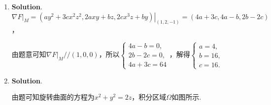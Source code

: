 \documentclass[../main.tex]{subfiles}
\begin{document}
\begin{enumerate}
          所以由夹逼定理可知$\lim_{\substack{x\to 0 \\ y\to 0}}\frac{x^{2}y^{2}}{\left(x^{2}+y^{2}\right)^{\frac{3}{2}}}
              =0=f(0,0)$，函数$f(x,y)$在原点处连续.

          又$f(x,0)=f(0,y)\equiv 0$，所以$f_{x}(0,0)=f_{y}(0,0)=0$，因此函数$f(x,y)$在原点处的偏导数存在.

          考察
          \[
              \lim_{\substack{x\to 0 \\ y\to 0}}\frac{f(x,y)-f(0,0)-f_{x}(0,0)x-f_{y}(0,0)y}{\sqrt{x^{2}+y^{2}}}
              = \lim_{\substack{x\to 0 \\ y\to 0}}\frac{x^{2} y^{2}}{\left(x^{2}+y^{2}\right)^{2}}.
          \]

          当$y=x,x\to0,y\to0$时，
          \[
              \lim_{\substack{x\to 0 \\ y\to 0}}\frac{x^{2} y^{2}}{\left(x^{2}+y^{2}\right)^{2}}
              = \lim_{x\to0}\frac{x^{4}}{(2x^{2})^{2}}= \frac{1}{4},
          \]
          所以$\lim_{\substack{x\to 0 \\ y\to 0}}
              \frac{x^{2} y^{2}}{\left(x^{2}+y^{2}\right)^{2}}\neq 0$，因此函数$f(x,y)$在原点处不可微.

    \item \textbf{Solution}. $\nabla F |_{M}= \left.\left(ay^{2}+3cx^{2} z^{2}
              , 2axy+bz, 2cx^{3} z + by\right)\right|_{(1,2,-1)}=(4a+3c, 4a-b, 2b-2c)$，

          由题意可知$\nabla F |_{M}// (1,0,0)$，所以$\begin{cases}
                  4a-b = 0,  \\
                  2b-2c = 0, \\
                  4a+3c = 64
              \end{cases}$，解得$\begin{cases}
                  a = 4,  \\
                  b = 16, \\
                  c = 16.
              \end{cases}$

    \item \textbf{Solution}.

          \noindent
          \begin{minipage}[c]{0.6\textwidth}
              由题可知旋转曲面的方程为$x^{2}+y^{2}=2z$，积分区域$\Omega$如图所示.


\end{minipage}
\end{enumerate}
\end{document}
